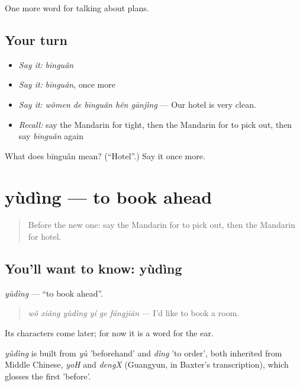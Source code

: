 \begin{grammarlens}[title={What you've built}]
One more word for talking about plans.
\end{grammarlens}

\subsection*{Your turn}
\begin{itemize}
\raggedright
  \item \emph{Say it:} \emph{bīnguǎn}
  \item \emph{Say it:} \emph{bīnguǎn}, once more
  \item \emph{Say it:} \emph{wǒmen de bīnguǎn hěn gānjìng} — Our hotel is very clean.
  \item \emph{Recall:} say the Mandarin for tight, then the Mandarin for to pick out, then say \emph{bīnguǎn} again
\end{itemize}

\begin{tcolorbox}[breakable,colback=teal!4,colframe=teal!35!black,title={Before you move on}]
What does bīnguǎn mean? (\textquotedblleft{}Hotel\textquotedblright{}.) Say it once more.
\end{tcolorbox}
\section[yùdìng]{yùdìng — to book ahead}

\label{lesson:ZH-C200-yuding}



\begin{quote}
Before the new one: say the Mandarin for to pick out, then the Mandarin for hotel.
\end{quote}

\subsection*{You'll want to know: yùdìng}
\emph{yùdìng} — \textquotedblleft{}to book ahead\textquotedblright{}.

\begin{quote}
\emph{wǒ xiǎng yùdìng yí ge fángjiān} — I'd like to book a room.
\end{quote}

Its characters come later; for now it is a word for the ear.

\begin{cousinweb}
\emph{yùdìng} is built from \emph{yù} 'beforehand' and \emph{dìng} 'to order', both inherited from Middle Chinese, \emph{yoH} and \emph{dengX} (Guangyun, in Baxter's transcription), which glosses the first 'before'.
\end{cousinweb}

